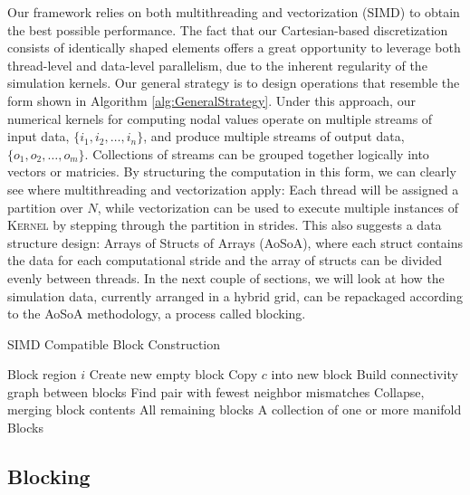 Our framework relies on both multithreading and vectorization (SIMD)
to obtain the best possible performance. The fact that our
Cartesian-based discretization consists of identically shaped elements
offers a great opportunity to leverage both thread-level and
data-level parallelism, due to the inherent regularity of the
simulation kernels. Our general strategy is to design operations that
resemble the form shown in Algorithm \ref{alg:GeneralStrategy}. Under
this approach, our numerical kernels for computing nodal values
operate on multiple streams of input data,
$\{ i_1, i_2,\ldots, i_n \}$, and produce multiple streams of output
data, $\{ o_1, o_2,\ldots, o_m \}$. Collections of streams can be
grouped together logically into vectors or matricies. By structuring
the computation in this form, we can clearly see where multithreading
and vectorization apply: Each thread will be assigned a partition over
$N$, while vectorization can be used to execute multiple instances of
\textsc{Kernel} by stepping through the partition in strides. This
also suggests a data structure design: Arrays of Structs of Arrays
(AoSoA), where each struct contains the data for each computational
stride and the array of structs can be divided evenly between
threads. In the next couple of sections, we will look at how the
simulation data, currently arranged in a hybrid grid, can be
repackaged according to the AoSoA methodology, a process called blocking. 

\begin{algorithm}
\caption{SIMD Compatible Block Construction}
\label{alg:BlockGeneration}
\begin{algorithmic}[1]
\Require Block region $i$
    \State Create new empty block
    \State Copy $c$ into new block
  \EndFor
  \State Build connectivity graph between blocks
  \Repeat
      \State Find pair with fewest neighbor mismatches
    \EndFor
      \State Collapse, merging block contents
     \EndIf
  \State \Return All remaining blocks
\EndFunction
\Ensure A collection of one or more manifold Blocks
\end{algorithmic}
\end{algorithm}


\subsection{Blocking}

